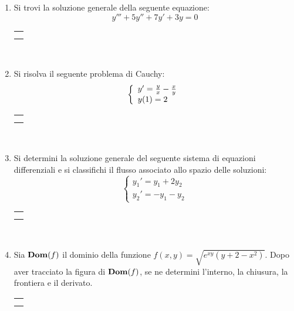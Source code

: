 \documentclass[12pt,a4paper]{report}\pagenumbering{roman}
\begin{document}
\begin{enumerate}
\item Si trovi la soluzione generale della seguente equazione:
$$y'''+5y''+7y'+3y=0$$
\hspace*{-3.5cm}\begin{tabular}{c}\hline\\\hspace*{16cm}\end{tabular}\\
\hspace*{-3.5cm}{\bf SVOLGIMENTO:}\pagebreak

\item Si risolva il seguente problema di Cauchy:
$$\left\{\begin{array}{l} y'={y\over x}-{x\over y} \\ y(1)=2
\end{array}\right.$$
\hspace*{-3.5cm}\begin{tabular}{c}\hline\\\hspace*{16cm}\end{tabular}\\
\hspace*{-3.5cm}{\bf SVOLGIMENTO:}\pagebreak

\item Si determini la soluzione generale del seguente sistema di 
equazioni differenziali e si classifichi il flusso associato allo spazio 
delle soluzioni:
$$\left\{\begin{array}{l}y_1'=y_1+2y_2\\ y_2'=-y_1-y_2\end{array}\right.$$
\hspace*{-3.5cm}\begin{tabular}{c}\hline\\\hspace*{16cm}\end{tabular}\\
\hspace*{-3.5cm}{\bf SVOLGIMENTO:}\pagebreak

\item Sia ${\bf Dom}(f)$ il dominio della funzione $f(x,y)=\sqrt{e^{xy}
(y+2-x^2)}$. Dopo aver tracciato la figura di ${\bf Dom}(f)$, se ne determini
l'interno, la chiusura, la frontiera e il derivato.\\
\hspace*{-3.5cm}\begin{tabular}{c}\hline\\\hspace*{16cm}\end{tabular}\\
\hspace*{-3.5cm}{\bf SVOLGIMENTO:}\pagebreak


\end{enumerate}
\end{document}
